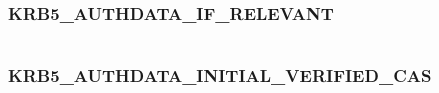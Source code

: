 \documentclass[letterpaper,10pt,english]{sphinxmanual}
\begin{document}
\begin{fulllineitems}
\label{appdev/refs/macros/KRB5_AUTHDATA_FX_ARMOR:KRB5_AUTHDATA_FX_ARMOR}
\end{fulllineitems}


\begin{tabulary}{\linewidth}{|L|L|}
\hline

 & 
\\\hline
\end{tabulary}



\subsubsection{KRB5\_AUTHDATA\_IF\_RELEVANT}
\label{appdev/refs/macros/KRB5_AUTHDATA_IF_RELEVANT:krb5-authdata-if-relevant-data}\label{appdev/refs/macros/KRB5_AUTHDATA_IF_RELEVANT:krb5-authdata-if-relevant}\label{appdev/refs/macros/KRB5_AUTHDATA_IF_RELEVANT::doc}

\begin{fulllineitems}
\label{appdev/refs/macros/KRB5_AUTHDATA_IF_RELEVANT:KRB5_AUTHDATA_IF_RELEVANT}
\end{fulllineitems}


\begin{tabulary}{\linewidth}{|L|L|}
\hline

 & 
\\\hline
\end{tabulary}



\subsubsection{KRB5\_AUTHDATA\_INITIAL\_VERIFIED\_CAS}
\label{appdev/refs/macros/KRB5_AUTHDATA_INITIAL_VERIFIED_CAS:krb5-authdata-initial-verified-cas-data}\label{appdev/refs/macros/KRB5_AUTHDATA_INITIAL_VERIFIED_CAS:krb5-authdata-initial-verified-cas}\label{appdev/refs/macros/KRB5_AUTHDATA_INITIAL_VERIFIED_CAS::doc}

\begin{fulllineitems}
\label{appdev/refs/macros/KRB5_AUTHDATA_INITIAL_VERIFIED_CAS:KRB5_AUTHDATA_INITIAL_VERIFIED_CAS}
\end{fulllineitems}
\end{document}
